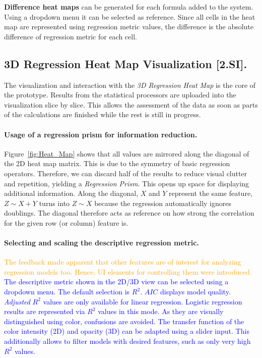 \documentclass[journal]{style/vgtc} 			          %
\newcommand{\add}[1]{\textcolor{blue}{#1}}
\newcommand{\design}[1]{\textcolor{orange}{#1}}
\begin{document}
\textbf{Difference heat maps} can be generated for each formula added to the system. %
Using a dropdown menu it can be selected as reference.
Since all cells in the heat map are represented using regression metric values, the difference is the absolute difference of regression metric for each cell.
\subsection{3D Regression Heat Map Visualization [2.SI].}
The visualization and interaction with the \emph{3D Regression Heat Map} is the core of the prototype.
Results from the statistical processors are uploaded into the visualization slice by slice.
This allows the assessment of the data as soon as parts of the calculations are finished while the rest is still in progress.

\paragraph{Usage of a regression prism for information reduction.}
Figure~\ref{fig:Heat_Map} shows that all values are mirrored along the diagonal of the 2D heat map matrix.
This is due to the symmetry of basic regression operators.
Therefore, we can discard half of the results to reduce visual clutter and repetition, yielding a \emph{Regression Prism}.
This opens up space for displaying additional information.
Along the diagonal, $X$ and $Y$ represent the same feature, $Z \sim X + Y$ turns into $Z \sim X$ because the regression automatically ignores doublings.
The diagonal therefore acts as reference on how strong the correlation for the given row (or column) feature is.

\paragraph{Selecting and scaling the descriptive regression metric.}
\design{
The feedback made apparent that other features are of interest for analyzing regression models too.
Hence, UI elements for controlling them were introduced.
}
\add{
The descriptive metric shown in the 2D/3D view can be selected using a dropdown menu.
The default selection is $R^2$.
$AIC$ displays model quality.
\emph{Adjusted} $R^2$ values are only available for linear regression.
Logistic regression results are represented via $R^2$ values in this mode.
As they are visually distinguished using color, confusions are avoided.
The transfer function of the color intensity (2D) and opacity (3D) can be adapted using a slider input.
This additionally allows to filter models with desired features, such as only very high $R^2$ values.
}
\end{document}
